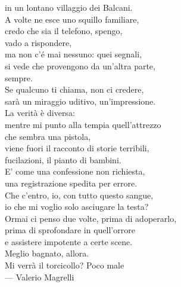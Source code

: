 \begin{flushright}
{in un lontano villaggio dei Balcani. \\
A volte ne esce uno squillo familiare, \\
credo che sia il telefono, spengo, \\
vado a rispondere, \\
ma non c’é mai nessuno: quei segnali, \\
si vede che provengono da un’altra parte, \\
sempre. \\
Se qualcuno ti chiama, non ci credere,\\
sarà un miraggio uditivo, un’impressione. \\
La verità è diversa: \\
mentre mi punto alla tempia quell’attrezzo \\
che sembra una pistola, \\
viene fuori il racconto di storie terribili, \\
fucilazioni, il pianto di bambini. \\
E’ come una confessione non richiesta, \\
una registrazione spedita per errore. \\
Che c’entro, io, con tutto questo sangue, \\
io che mi voglio solo asciugare la testa? \\
Ormai ci penso due volte, prima di adoperarlo, \\
prima di sprofondare in quell’orrore \\
e assistere impotente a certe scene. \\
Meglio bagnato, allora. \\
Mi verrà il torcicollo? Poco male} \\ \medskip
--- Valerio Magrelli%

\end{flushright}